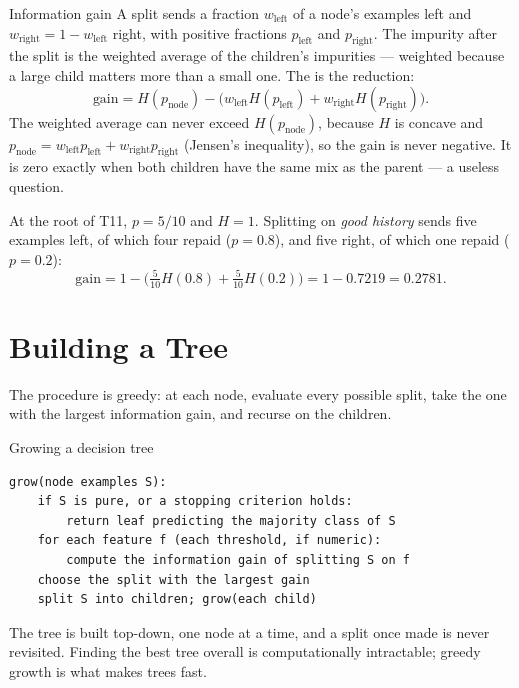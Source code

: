 \begin{derivation}{Information gain}
A split sends a fraction $w_{\text{left}}$ of a node's examples left and
$w_{\text{right}} = 1 - w_{\text{left}}$ right, with positive fractions
$p_{\text{left}}$ and $p_{\text{right}}$. The impurity after the split is the
weighted average of the children's impurities --- weighted because a large child
matters more than a small one. The  is the reduction:
\[
  \text{gain} = H(p_{\text{node}})
    - \bigl(w_{\text{left}}H(p_{\text{left}}) + w_{\text{right}}H(p_{\text{right}})\bigr) .
\]
The weighted average can never exceed $H(p_{\text{node}})$, because $H$ is
concave and $p_{\text{node}} = w_{\text{left}}p_{\text{left}} +
w_{\text{right}}p_{\text{right}}$ (Jensen's inequality), so the gain is never
negative. It is zero exactly when both children have the same mix as the parent
--- a useless question.

At the root of T11, $p = 5/10$ and $H = 1$. Splitting on \emph{good history}
sends five examples left, of which four repaid ($p = 0.8$), and five right, of
which one repaid ($p = 0.2$):
\[
  \text{gain} = 1 - \bigl(\tfrac{5}{10}H(0.8) + \tfrac{5}{10}H(0.2)\bigr)
              = 1 - 0.7219 = 0.2781 .
\]
\end{derivation}

\section{Building a Tree}
\label{sec:build-tree}

The procedure is greedy: at each node, evaluate every possible split, take the
one with the largest information gain, and recurse on the children.

\begin{algorithmbox}{Growing a decision tree}
\begin{lstlisting}[style=pseudocode]
grow(node examples S):
    if S is pure, or a stopping criterion holds:
        return leaf predicting the majority class of S
    for each feature f (each threshold, if numeric):
        compute the information gain of splitting S on f
    choose the split with the largest gain
    split S into children; grow(each child)
\end{lstlisting}
The tree is built top-down, one node at a time, and a split once made is never
revisited. Finding the best tree overall is computationally intractable; greedy
growth is what makes trees fast.
\end{algorithmbox}

